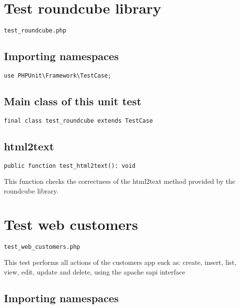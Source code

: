\documentclass[a4paper]{book}
\begin{document}
\hypertarget{toc51}{}
\section{Test roundcube library}

\begin{lstlisting}
test_roundcube.php
\end{lstlisting}

\hypertarget{toc52}{}
\subsection{Importing namespaces}

\begin{lstlisting}
use PHPUnit\Framework\TestCase;
\end{lstlisting}

\hypertarget{toc53}{}
\subsection{Main class of this unit test}

\begin{lstlisting}
final class test_roundcube extends TestCase
\end{lstlisting}

\hypertarget{toc54}{}
\subsection{html2text}

\begin{lstlisting}
public function test_html2text(): void
\end{lstlisting}

This function checks the correctness of the html2text method provided by the
roundcube library.

\hypertarget{toc55}{}
\section{Test web customers}

\begin{lstlisting}
test_web_customers.php
\end{lstlisting}

This test performs all actions of the customers app suck as: create, insert,
list, view, edit, update and delete, using the apache sapi interface

\hypertarget{toc56}{}
\subsection{Importing namespaces}
\end{document}
